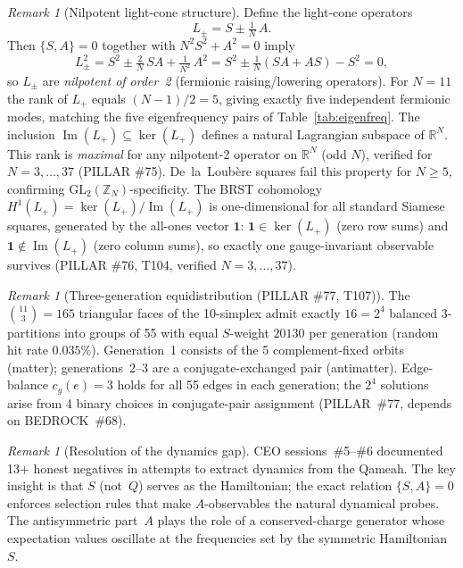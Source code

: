 \documentclass[aps,prd,twocolumn,superscriptaddress,floatfix,nofootinbib]{revtex4-2}
\theoremstyle{definition}
\theoremstyle{remark}
\newtheorem{remark}[theorem]{Remark}
\begin{document}
\begin{remark}[Nilpotent light-cone structure]
\label{rem:nilpotent-lightcone}
Define the light-cone operators
\begin{equation}
  L_{\pm} = S \pm \tfrac{1}{N}\,A.
\end{equation}
Then $\{S,A\}=0$ together with $N^2S^2+A^2=0$ imply
\begin{equation}
  L_{\pm}^2 = S^2 \pm \tfrac{2}{N}\,SA + \tfrac{1}{N^2}\,A^2
            = S^2 \pm \tfrac{1}{N}(SA+AS) - S^2 = 0,
\end{equation}
so $L_{\pm}$ are \emph{nilpotent of order~2} (fermionic raising/lowering
operators).  For $N{=}11$ the rank of $L_+$ equals $(N{-}1)/2 = 5$,
giving exactly five independent fermionic modes, matching the five
eigenfrequency pairs of Table~\ref{tab:eigenfreq}.
The inclusion $\operatorname{Im}(L_+)\subseteq\ker(L_+)$ defines a
natural Lagrangian subspace of $\mathbb{R}^{N}$.
This rank is \emph{maximal} for any nilpotent-2 operator on
$\mathbb{R}^N$ (odd $N$), verified for $N = 3,\ldots,37$ (PILLAR \#75).
De~la~Loub\`{e}re squares fail this property for $N \geq 5$, confirming
GL${}_2(\mathbb{Z}_N)$-specificity.
The BRST cohomology $H^1(L_+) = \ker(L_+)/\operatorname{Im}(L_+)$ is
one-dimensional for all standard Siamese squares, generated by the
all-ones vector $\mathbf{1}$: $\mathbf{1}\in\ker(L_+)$ (zero row sums)
and $\mathbf{1}\notin\operatorname{Im}(L_+)$ (zero column sums), so
exactly one gauge-invariant observable survives (PILLAR \#76, T104,
verified $N=3,\ldots,37$).
\end{remark}

\begin{remark}[Three-generation equidistribution (PILLAR \#77, T107)]
The $\binom{11}{3}=165$ triangular faces of the 10-simplex admit exactly
$16=2^4$ balanced 3-partitions into groups of 55 with equal $S$-weight
$20130$ per generation (random hit rate $0.035\%$).  Generation~1 consists
of the 5 complement-fixed orbits (matter); generations~2--3 are a
conjugate-exchanged pair (antimatter).  Edge-balance $c_g(e)=3$ holds for
all 55 edges in each generation; the $2^4$ solutions arise from 4 binary
choices in conjugate-pair assignment (PILLAR~\#77, depends on BEDROCK~\#68).
\end{remark}

\begin{remark}[Resolution of the dynamics gap]
CEO sessions~\#5--\#6 documented 13+ honest negatives in attempts to
extract dynamics from the Qameah.  The key insight is that $S$ (not~$Q$)
serves as the Hamiltonian; the exact relation $\{S,A\}=0$ enforces
selection rules that make $A$-observables the natural dynamical probes.
The antisymmetric part~$A$ plays the role of a conserved-charge generator
whose expectation values oscillate at the frequencies set by the
symmetric Hamiltonian~$S$.
\end{remark}
\end{document}
